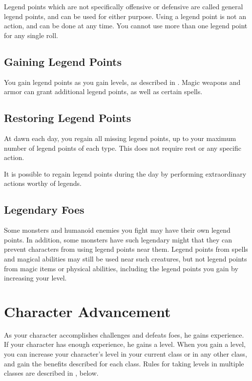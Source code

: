         Legend points which are not specifically offensive or defensive are called general legend points, and can be used for either purpose.
        Using a legend point is not an action, and can be done at any time.
        You cannot use more than one legend point for any single roll.

    \subsection{Gaining Legend Points}

        You gain legend points as you gain levels, as described in .
        Magic weapons and armor can grant additional legend points, as well as certain spells.

    \subsection{Restoring Legend Points}

        At dawn each day, you regain all missing legend points, up to your maximum number of legend points of each type.
        This does not require rest or any specific action.

        It is possible to regain legend points during the day by performing extraordinary actions worthy of legends.

    \subsection{Legendary Foes}
        Some monsters and humanoid enemies you fight may have their own legend points.
        In addition, some monsters have such legendary might that they can prevent characters from using legend points near them.
        Legend points from spells and magical abilities may still be used near such creatures, but not legend points from magic items or physical abilities, including the legend points you gain by increasing your level.

\section{Character Advancement}\label{Character Advancement}

    As your character accomplishes challenges and defeats foes, he gains experience.
    If your character has enough experience, he gains a level.
    When you gain a level, you can increase your character's level in your current class or in any other class, and gain the benefits described for each class.
    Rules for taking levels in multiple classes are described in , below.

